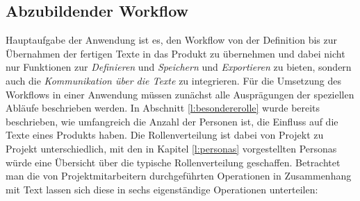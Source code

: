 \subsection{Abzubildender Workflow}\label{l:workflow}

Hauptaufgabe der Anwendung ist es, den Workflow von der Definition bis zur Übernahmen der fertigen Texte in das Produkt zu übernehmen und dabei nicht nur Funktionen zur \emph{Definieren} und \emph{Speichern} und \emph{Exportieren} zu bieten, sondern auch die \emph{Kommunikation über die Texte} zu integrieren. Für die Umsetzung des Workflows in einer Anwendung müssen zunächst alle Ausprägungen der speziellen Abläufe beschrieben werden. In Abschnitt \ref{l:besondererolle} wurde bereits beschrieben, wie umfangreich die Anzahl der Personen ist, die Einfluss auf die Texte eines Produkts haben. Die Rollenverteilung ist dabei von Projekt zu Projekt unterschiedlich, mit den in Kapitel \ref{l:personas} vorgestellten Personas würde eine Übersicht über die typische Rollenverteilung geschaffen. Betrachtet man die von Projektmitarbeitern durchgeführten Operationen in Zusammenhang mit Text lassen sich diese in sechs eigenständige Operationen unterteilen:

